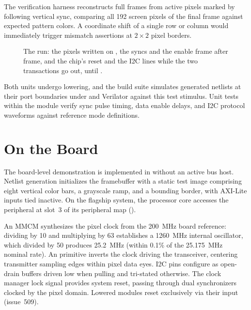 \documentclass[journal,9pt]{IEEEtran}
\begin{document}
The verification harness reconstructs full frames from active pixels
marked by  following vertical sync, comparing all 192 screen
pixels of the final frame against expected pattern colors. A coordinate
shift of a single row or column would immediately trigger mismatch
assertions at $2 \times 2$ pixel borders.

\begin{figure}[t]
\centering

\caption{The run: the pixels written on , the syncs and the
enable frame after frame, and the chip's reset and
the I2C lines while the two transactions go out, until .}
\label{fig:h-run}
\end{figure}





Both units undergo lowering, and the build suite simulates generated
netlists at their port boundaries under  and Verilator against
this test stimulus. Unit tests within the module verify sync pulse timing,
data enable delays, and I2C protocol waveforms against reference mode
definitions.

\section{On the Board}
\label{sec:h-board}

The board-level demonstration is implemented in  without an
active bus host. Netlist generation initializes the framebuffer with a
static test image comprising eight vertical color bars, a grayscale ramp,
and a bounding border, with AXI-Lite inputs tied inactive. On the flagship
system, the processor core accesses the peripheral at slot~3 of its
peripheral map ().



An MMCM synthesizes the pixel clock from the 200~MHz board reference:
dividing by 10 and multiplying by 63 establishes a 1260~MHz internal
oscillator, which divided by 50 produces 25.2~MHz (within 0.1\% of the
25.175~MHz nominal rate). An  primitive inverts the clock driving
the transceiver, centering transmitter sampling edges within pixel data
eyes. I2C pins configure as open-drain buffers driven low when pulling and
tri-stated otherwise. The clock manager lock signal provides system reset,
passing through dual synchronizers clocked by the pixel domain. Lowered
modules reset exclusively via their  input (issue~509).
\end{document}

